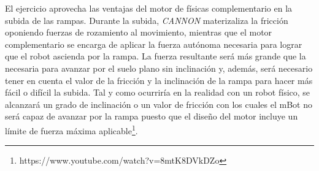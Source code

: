 El ejercicio  aprovecha las ventajas del motor de físicas complementario en la subida de las rampas. Durante la subida, \textit{CANNON} materizaliza la fricción oponiendo fuerzas de rozamiento al movimiento, mientras que el motor complementario se encarga de aplicar la fuerza autónoma necesaria para lograr que el robot ascienda por la rampa. La fuerza resultante será más grande que la necesaria para avanzar por el suelo plano sin inclinación y, además, será necesario tener en cuenta el valor de la fricción y la inclinación de la rampa para hacer más fácil o difícil la subida. Tal y como ocurriría en la realidad con un robot físico, se alcanzará un grado de inclinación o un valor de fricción con los cuales el mBot no será capaz de avanzar por la rampa puesto que el diseño del motor incluye un límite de fuerza máxima aplicable\footnote{https://www.youtube.com/watch?v=8mtK8DVkDZo}.


